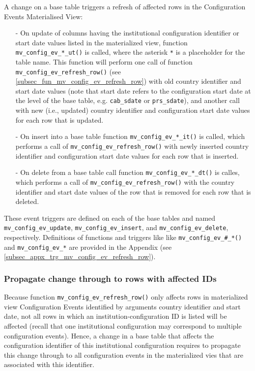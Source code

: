 A change on a base table triggers a refresh of affected rows in the Configuration Events Materialised View:
\begin{itemize}

\item[-]{On update of columns having the institutional configuration identifier or start date values listed in the materialized view, function \texttt{mv\_config\_ev\_*\_ut()} is called, where the asterisk \texttt{*} is a placeholder for the table name.
This function will perform one call of function \texttt{mv\_config\_ev\_refresh\_row()} (see \ref{subsec_fun_mv_config_ev_refresh_row}) with old country identifier and start date values (note that start date refers to the configuration start date at the level of the base table, e.g. \texttt{cab\_sdate} or \texttt{prs\_sdate}), and another call with new (i.e., updated) country identifier and configuration start date values for each row that is updated.}

\item[-]{On insert into a base table function \texttt{mv\_config\_ev\_*\_it()} is called, which performs a call of \texttt{mv\_config\_ev\_refresh\_row()} with newly inserted country identifier and configuration start date values for each row that is inserted.}

\item[-]{On delete from a base table call function \texttt{mv\_config\_ev\_*\_dt()} is calles, which performs a call of \texttt{mv\_config\_ev\_refresh\_row()} with the country identifier and start date values of the row that is removed for each row that is deleted.}
\end{itemize}

These event triggers are defined on each of the base tables and named \texttt{mv\_config\_ev\_update}, \texttt{mv\_config\_ev\_insert}, and \texttt{mv\_config\_ev\_delete}, respectively. 
Definitions of functions and triggers like  like \texttt{mv\_config\_ev\_\#\_*()} and \texttt{mv\_config\_ev\_*} are provided in the Appendix (see \ref{subsec_appx_trg_mv_config_ev_refresh_row}). 

\subsubsection{Propagate change through to rows with affected IDs}

Because function \texttt{mv\_config\_ev\_refresh\_row()} only affects rows in materialized view Configuration Events identified by arguments country identifier and start date, not all rows in which an institution-configuration ID is listed will be affected (recall that one institutional configuration may correspond to multiple configuration events).
Hence, a change in a base table that affects the configuration identifier of this institutional configuration requires to propagate this change through to all configuration events in the materialized vies that are associated with this identifier. 

